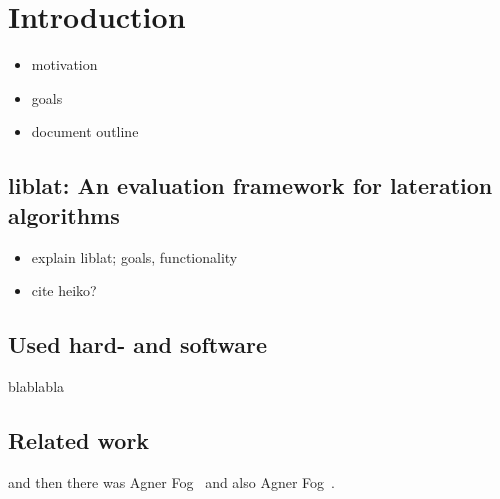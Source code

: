 \section{Introduction} 
\begin{itemize}
\item motivation
\item goals
\item document outline
\end{itemize}
\subsection{liblat: An evaluation framework for lateration algorithms}
\begin{itemize}
\item explain liblat; goals, functionality
\item cite heiko?
\end{itemize}
\subsection{Used hard- and software}
blablabla
\subsection{Related work}
and then there was Agner Fog~\cite{fog2011optimizing} and also Agner Fog~\cite{fog2011instructiontables}.
